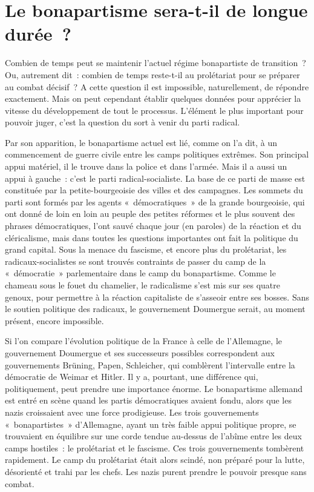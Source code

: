 \documentclass[french,twoside]{book} %
\begin{document}
\section[{Le bonapartisme sera-t-il de longue durée ?}]{Le bonapartisme sera-t-il de longue durée ?}
\noindent Combien de temps peut se maintenir l’actuel régime bonapartiste de transition ? Ou, autrement dit : combien de temps reste-t-il au prolétariat pour se préparer au combat décisif ? A cette question il est impossible, naturellement, de répondre exactement. Mais on peut cependant établir quelques données pour apprécier la vitesse du développement de tout le processus. L’élément le plus important pour pouvoir juger, c’est la question du sort à venir du parti radical.\par
 Par son apparition, le bonapartisme actuel est lié, comme on l’a dit, à un commencement de guerre civile entre les camps politiques extrêmes. Son principal appui matériel, il le trouve dans la police et dans l’armée. Mais il a aussi un appui à gauche : c’est le parti radical-socialiste. La base de ce parti de masse est constituée par la petite-bourgeoisie des villes et des campagnes. Les sommets du parti sont formés par les agents « démocratiques » de la grande bourgeoisie, qui ont donné de loin en loin au peuple des petites réformes et le plus souvent des phrases démocratiques, l’ont sauvé chaque jour (en paroles) de la réaction et du cléricalisme, mais dans toutes les questions importantes ont fait la politique du grand capital. Sous la menace du fascisme, et encore plus du prolétariat, les radicaux-socialistes se sont trouvés contraints de passer du camp de la « démocratie » parlementaire dans le camp du bonapartisme. Comme le chameau sous le fouet du chamelier, le radicalisme s’est mis sur ses quatre genoux, pour permettre à la réaction capitaliste de s’asseoir entre ses bosses. Sans le soutien politique des radicaux, le gouvernement Doumergue serait, au moment présent, encore impossible.\par
Si l’on compare l’évolution politique de la France à celle de l’Allemagne, le gouvernement Doumergue et ses successeurs possibles correspondent aux gouvernements Brüning, Papen, Schleicher, qui comblèrent l’intervalle entre la démocratie de Weimar et Hitler. Il y a, pourtant, une différence qui, politiquement, peut prendre une importance énorme. Le bonapartisme allemand est entré en scène quand les partis démocratiques avaient fondu, alors que les nazis croissaient avec une force prodigieuse. Les trois gouvernements « bonapartistes » d’Allemagne, ayant un très faible appui politique propre, se trouvaient en équilibre sur une corde tendue au-dessus de l’abîme entre les deux camps hostiles : le prolétariat et le  fascisme. Ces trois gouvernements tombèrent rapidement. Le camp du prolétariat était alors scindé, non préparé pour la lutte, désorienté et trahi par les chefs. Les nazis purent prendre le pouvoir presque sans combat.\par
\end{document}

